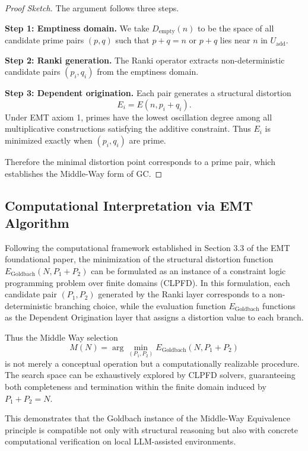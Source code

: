\documentclass[12pt]{article}
\theoremstyle{definition}
\theoremstyle{remark}
\begin{document}
\begin{proof}[Proof Sketch]
The argument follows three steps.

\textbf{Step 1: Emptiness domain.}
We take $D_{\mathrm{empty}}(n)$ to be the space of all candidate
prime pairs $(p,q)$ such that $p + q = n$ or $p + q$ lies near $n$
in $U_{\mathrm{add}}$.

\textbf{Step 2: Ranki generation.}
The Ranki operator extracts non-deterministic candidate pairs
$(p_i,q_i)$ from the emptiness domain.

\textbf{Step 3: Dependent origination.}
Each pair generates a structural distortion
\[
E_i = E(n, p_i + q_i).
\]
Under EMT axiom 1, primes have the lowest oscillation degree among
all multiplicative constructions satisfying the additive constraint.
Thus $E_i$ is minimized exactly when $(p_i,q_i)$ are prime.

Therefore the minimal distortion point corresponds to a prime pair,
which establishes the Middle-Way form of GC.
\end{proof}

\subsection{Computational Interpretation via EMT Algorithm}

Following the computational framework established in Section 3.3 of the
EMT foundational paper, the minimization of the structural distortion
function $E_{\text{Goldbach}}(N, P_1+P_2)$ can be formulated as an
instance of a constraint logic programming problem over finite domains
(CLPFD). In this formulation, each candidate pair $(P_1, P_2)$ generated
by the Ranki layer corresponds to a non-deterministic branching choice,
while the evaluation function $E_{\text{Goldbach}}$ functions as the
Dependent Origination layer that assigns a distortion value to each
branch.

Thus the Middle Way selection
\[
M(N) = \arg\min_{(P_1,P_2)} E_{\text{Goldbach}}(N, P_1+P_2)
\]
is not merely a conceptual operation but a computationally realizable
procedure. The search space can be exhaustively explored by CLPFD
solvers, guaranteeing both completeness and termination within the
finite domain induced by $P_1 + P_2 = N$.

This demonstrates that the Goldbach instance of the Middle-Way
Equivalence principle is compatible not only with structural reasoning
but also with concrete computational verification on local LLM-assisted
environments.
\end{document}
